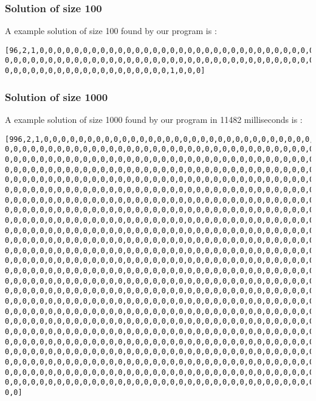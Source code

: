 \documentclass{eplDoc}
\begin{document}
\subsubsection{Solution of size 100}
A example solution of size 100 found by our program is : \\ 

\begin{lstlisting}
[96,2,1,0,0,0,0,0,0,0,0,0,0,0,0,0,0,0,0,0,0,0,0,0,0,0,0,0,0,0,0,0,0,0,0,0,0,0, 0,0,0,0,0,0,0,0,0,0,0,0,0,0,0,0,0,0,0,0,0,0,0,0,0,0,0,0,0,0,0,0,0,0,0,0,0,0,0, 0,0,0,0,0,0,0,0,0,0,0,0,0,0,0,0,0,0,0,1,0,0,0]
\end{lstlisting}
\subsubsection{Solution of size 1000}
A example solution of size 1000 found by our program in 11482 milliseconds is : \\
\begin{lstlisting}
[996,2,1,0,0,0,0,0,0,0,0,0,0,0,0,0,0,0,0,0,0,0,0,0,0,0,0,0,0,0,0,0,0,0,0,0,0,0, 0,0,0,0,0,0,0,0,0,0,0,0,0,0,0,0,0,0,0,0,0,0,0,0,0,0,0,0,0,0,0,0,0,0,0,0,0,0,0,0, 0,0,0,0,0,0,0,0,0,0,0,0,0,0,0,0,0,0,0,0,0,0,0,0,0,0,0,0,0,0,0,0,0,0,0,0,0,0,0,0, 0,0,0,0,0,0,0,0,0,0,0,0,0,0,0,0,0,0,0,0,0,0,0,0,0,0,0,0,0,0,0,0,0,0,0,0,0,0,0,0, 0,0,0,0,0,0,0,0,0,0,0,0,0,0,0,0,0,0,0,0,0,0,0,0,0,0,0,0,0,0,0,0,0,0,0,0,0,0,0,0, 0,0,0,0,0,0,0,0,0,0,0,0,0,0,0,0,0,0,0,0,0,0,0,0,0,0,0,0,0,0,0,0,0,0,0,0,0,0,0,0, 0,0,0,0,0,0,0,0,0,0,0,0,0,0,0,0,0,0,0,0,0,0,0,0,0,0,0,0,0,0,0,0,0,0,0,0,0,0,0,0, 0,0,0,0,0,0,0,0,0,0,0,0,0,0,0,0,0,0,0,0,0,0,0,0,0,0,0,0,0,0,0,0,0,0,0,0,0,0,0,0, 0,0,0,0,0,0,0,0,0,0,0,0,0,0,0,0,0,0,0,0,0,0,0,0,0,0,0,0,0,0,0,0,0,0,0,0,0,0,0,0, 0,0,0,0,0,0,0,0,0,0,0,0,0,0,0,0,0,0,0,0,0,0,0,0,0,0,0,0,0,0,0,0,0,0,0,0,0,0,0,0, 0,0,0,0,0,0,0,0,0,0,0,0,0,0,0,0,0,0,0,0,0,0,0,0,0,0,0,0,0,0,0,0,0,0,0,0,0,0,0,0, 0,0,0,0,0,0,0,0,0,0,0,0,0,0,0,0,0,0,0,0,0,0,0,0,0,0,0,0,0,0,0,0,0,0,0,0,0,0,0,0, 0,0,0,0,0,0,0,0,0,0,0,0,0,0,0,0,0,0,0,0,0,0,0,0,0,0,0,0,0,0,0,0,0,0,0,0,0,0,0,0, 0,0,0,0,0,0,0,0,0,0,0,0,0,0,0,0,0,0,0,0,0,0,0,0,0,0,0,0,0,0,0,0,0,0,0,0,0,0,0,0, 0,0,0,0,0,0,0,0,0,0,0,0,0,0,0,0,0,0,0,0,0,0,0,0,0,0,0,0,0,0,0,0,0,0,0,0,0,0,0,0, 0,0,0,0,0,0,0,0,0,0,0,0,0,0,0,0,0,0,0,0,0,0,0,0,0,0,0,0,0,0,0,0,0,0,0,0,0,0,0,0, 0,0,0,0,0,0,0,0,0,0,0,0,0,0,0,0,0,0,0,0,0,0,0,0,0,0,0,0,0,0,0,0,0,0,0,0,0,0,0,0, 0,0,0,0,0,0,0,0,0,0,0,0,0,0,0,0,0,0,0,0,0,0,0,0,0,0,0,0,0,0,0,0,0,0,0,0,0,0,0,0, 0,0,0,0,0,0,0,0,0,0,0,0,0,0,0,0,0,0,0,0,0,0,0,0,0,0,0,0,0,0,0,0,0,0,0,0,0,0,0,0, 0,0,0,0,0,0,0,0,0,0,0,0,0,0,0,0,0,0,0,0,0,0,0,0,0,0,0,0,0,0,0,0,0,0,0,0,0,0,0,0, 0,0,0,0,0,0,0,0,0,0,0,0,0,0,0,0,0,0,0,0,0,0,0,0,0,0,0,0,0,0,0,0,0,0,0,0,0,0,0,0, 0,0,0,0,0,0,0,0,0,0,0,0,0,0,0,0,0,0,0,0,0,0,0,0,0,0,0,0,0,0,0,0,0,0,0,0,0,0,0,0, 0,0,0,0,0,0,0,0,0,0,0,0,0,0,0,0,0,0,0,0,0,0,0,0,0,0,0,0,0,0,0,0,0,0,0,0,0,0,0,0, 0,0,0,0,0,0,0,0,0,0,0,0,0,0,0,0,0,0,0,0,0,0,0,0,0,0,0,0,0,0,0,0,0,0,0,0,0,0,0,0, 0,0,0,0,0,0,0,0,0,0,0,0,0,0,0,0,0,0,0,0,0,0,0,0,0,0,0,0,0,0,0,0,0,0,0,0,0,0,1,0, 0,0]
\end{lstlisting}
\end{document}
